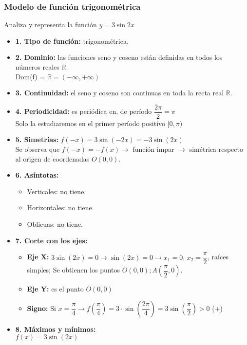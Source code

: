 \subsubsection{Modelo de función trigonométrica}
Analiza y representa la función $y=3 \sin 2x$
\begin{itemize}
	\item \textbf{1. Tipo de función: }trigonométrica.
	\item \textbf{2. Dominio: }las funciones seno y coseno están definidas en todos los números reales $\mathbb{R}$.\\
	Dom(f) = $\mathbb{R}=(-\infty, +\infty)$
	\item \textbf{3. Continuidad: }el seno y coseno son continuas en toda la recta real $\mathbb{R}$.
	\item \textbf{4. Periodicidad: }es periódica en, de período $\dfrac{2\pi}{2} = \pi$\\
	Solo la estudiaremos en el primer período positivo $[0, \pi)$
	\item \textbf{5. Simetrías: }$f(-x) = 3 \sin (-2x) = -3 \sin (2x)$\\
	Se observa que $f(-x)=-f(x) \rightarrow$ función impar $\rightarrow$ simétrica respecto al origen de coordenadas $O(0,0)$.
	\item \textbf{6. Asíntotas: }
	\begin{itemize}
		\item Verticales: no tiene.
		\item Horizontales: no tiene.
		\item Oblicuas: no tiene.
	\end{itemize}
	\item \textbf{7. Corte con los ejes: }
	\begin{itemize}
		\item \textbf{Eje X: }$3\sin(2x)=0 \rightarrow \sin(2x) = 0 \rightarrow x_1=0$, $x_2=\dfrac{\pi}{2}$, raíces simples; Se obtienen los puntos $O(0,0); A(\dfrac{\pi}{2}, 0)$.\\
		\item \textbf{Eje Y: }es el punto $O(0,0)$
		\item \textbf{Signo: }Si $x=\dfrac{\pi}{4} \rightarrow f(\dfrac{\pi}{4})=3\cdot \sin(\dfrac{2\pi}{4}) = 3 \sin(\dfrac{\pi}{2})>0$ (+)
	\end{itemize}
	\item \textbf{8. Máximos y mínimos: }\\
	$f(x)=3 \sin(2x)$
	\begin{itemize}

\end{itemize}
\end{itemize}
